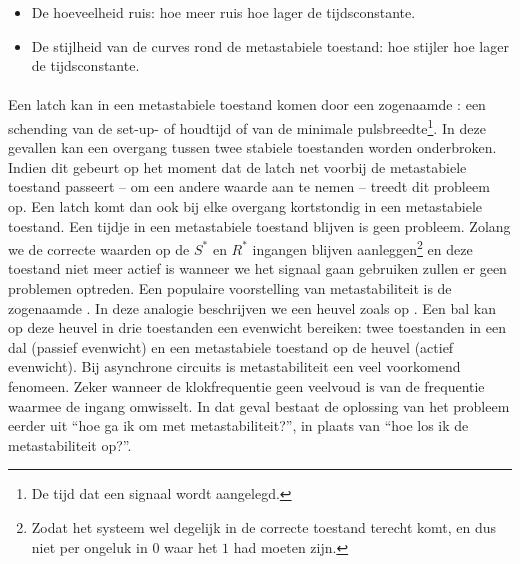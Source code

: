 \begin{itemize}
 \item De hoeveelheid ruis: hoe meer ruis hoe lager de tijdsconstante.
 \item De stijlheid van de curves rond de metastabiele toestand: hoe stijler hoe lager de tijdsconstante.
\end{itemize}

\paragraph{}
Een latch kan in een metastabiele toestand komen door een zogenaamde : een schending van de set-up- of houdtijd of van de minimale pulsbreedte\footnote{De tijd dat een signaal wordt aangelegd.}. In deze gevallen kan een overgang tussen twee stabiele toestanden worden onderbroken. Indien dit gebeurt op het moment dat de latch net voorbij de metastabiele toestand passeert -- om een andere waarde aan te nemen -- treedt dit probleem op. Een latch komt dan ook bij elke overgang kortstondig in een metastabiele toestand. Een tijdje in een metastabiele toestand blijven is geen probleem. Zolang we de correcte waarden op de $S^*$ en $R^*$ ingangen blijven aanleggen\footnote{Zodat het systeem wel degelijk in de correcte toestand terecht komt, en dus niet per ongeluk in $0$ waar het $1$ had moeten zijn.} en deze toestand niet meer actief is wanneer we het signaal gaan gebruiken zullen er geen problemen optreden. Een populaire voorstelling van metastabiliteit is de zogenaamde . In deze analogie beschrijven we een heuvel zoals op . Een bal kan op deze heuvel in drie toestanden een evenwicht bereiken: twee toestanden in een dal (passief evenwicht) en een metastabiele toestand op de heuvel (actief evenwicht). Bij asynchrone circuits is metastabiliteit een veel voorkomend fenomeen. Zeker wanneer de klokfrequentie geen veelvoud is van de frequentie waarmee de ingang omwisselt. In dat geval bestaat de oplossing van het probleem eerder uit ``hoe ga ik om met metastabiliteit?'', in plaats van ``hoe los ik de metastabiliteit op?''.

